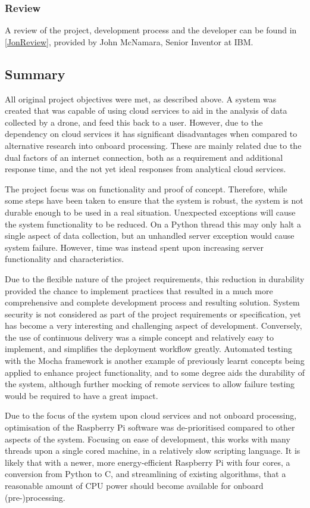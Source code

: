 \documentclass{article}
\begin{document}
\subsubsection{Review}
A review of the project, development process and the developer can be found in \ref{JonReview}, provided by John McNamara, Senior Inventor at IBM.

\subsection{Summary}
All original project objectives were met, as described above. A system was created that was capable of using cloud services to aid in the analysis of data collected by a drone, and feed this back to a user. However, due to the dependency on cloud services it has significant disadvantages when compared to alternative research into onboard processing. These are mainly related due to the dual factors of an internet connection, both as a requirement and additional response time, and the not yet ideal responses from analytical cloud services. 

The project focus was on functionality and proof of concept. Therefore, while some steps have been taken to ensure that the system is robust, the system is not durable enough to be used in a real situation. Unexpected exceptions will cause the system functionality to be reduced. On a Python thread this may only halt a single aspect of data collection, but an unhandled server exception would cause system failure. However, time was instead spent upon increasing server functionality and characteristics. 

Due to the flexible nature of the project requirements, this reduction in durability provided the chance to implement practices that resulted in a much more comprehensive and complete development process and resulting solution. System security is not considered as part of the project requirements or specification, yet has become a very interesting and challenging aspect of development. Conversely, the use of continuous delivery was a simple concept and relatively easy to implement, and simplifies the deployment workflow greatly. Automated testing with the Mocha framework is another example of previously learnt concepts being applied to enhance project functionality, and to some degree aids the durability of the system, although further mocking of remote services to allow failure testing would be required to have a great impact.

Due to the focus of the system upon cloud services and not onboard processing, optimisation of the Raspberry Pi software was de-prioritised compared to other aspects of the system. Focusing on ease of development, this works with many threads upon a single cored machine, in a relatively slow scripting language. It is likely that with a newer, more energy-efficient Raspberry Pi with four cores, a conversion from Python to C, and streamlining of existing algorithms, that a reasonable amount of CPU power should become available for onboard (pre-)processing.
\end{document}
